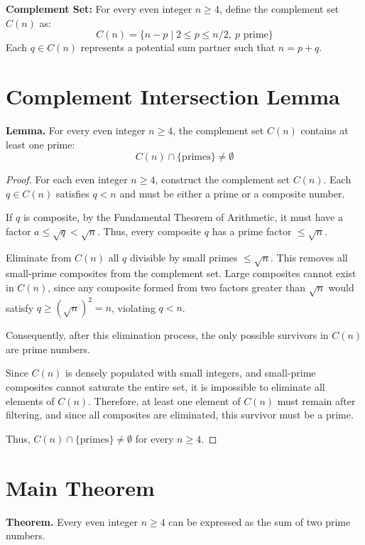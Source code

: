 \documentclass[11pt]{article}
\begin{document}
	\textbf{Complement Set:} For every even integer \( n \geq 4 \), define the complement set \( C(n) \) as:
	\[
	C(n) = \{ n - p \mid 2 \leq p \leq n/2,\ p \text{ prime} \}
	\]
	Each \( q \in C(n) \) represents a potential sum partner such that \( n = p + q \).
	
	\section{Complement Intersection Lemma}
	
	\textbf{Lemma.} For every even integer \( n \geq 4 \), the complement set \( C(n) \) contains at least one prime:
	\[
	C(n) \cap \{\text{primes}\} \neq \emptyset
	\]
	
	\begin{proof}
		For each even integer \( n \geq 4 \), construct the complement set \( C(n) \). Each \( q \in C(n) \) satisfies \( q < n \) and must be either a prime or a composite number.
		
		If \( q \) is composite, by the Fundamental Theorem of Arithmetic, it must have a factor \( a \leq \sqrt{q} < \sqrt{n} \). Thus, every composite \( q \) has a prime factor \( \leq \sqrt{n} \).
		
		Eliminate from \( C(n) \) all \( q \) divisible by small primes \( \leq \sqrt{n} \). This removes all small-prime composites from the complement set. Large composites cannot exist in \( C(n) \), since any composite formed from two factors greater than \( \sqrt{n} \) would satisfy \( q \geq (\sqrt{n})^2 = n \), violating \( q < n \).
		
		Consequently, after this elimination process, the only possible survivors in \( C(n) \) are prime numbers.
		
		Since \( C(n) \) is densely populated with small integers, and small-prime composites cannot saturate the entire set, it is impossible to eliminate all elements of \( C(n) \). Therefore, at least one element of \( C(n) \) must remain after filtering, and since all composites are eliminated, this survivor must be a prime.
		
		Thus, \( C(n) \cap \{\text{primes}\} \neq \emptyset \) for every \( n \geq 4 \).
	\end{proof}
	
	\section{Main Theorem}
	
	\textbf{Theorem.} Every even integer \( n \geq 4 \) can be expressed as the sum of two prime numbers.
	
\end{document}
